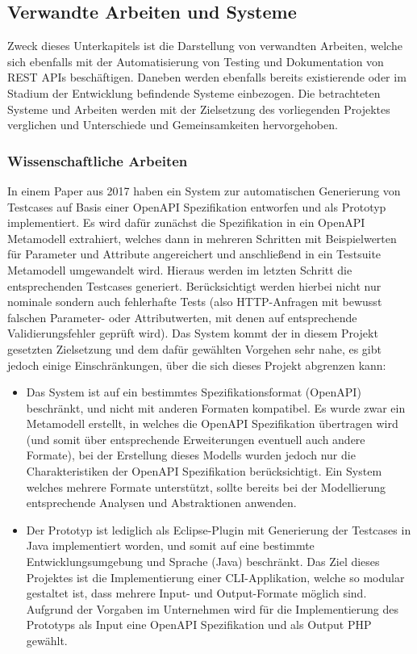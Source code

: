 \newpage

\subsection{Verwandte Arbeiten und Systeme}

Zweck dieses Unterkapitels ist die Darstellung von verwandten Arbeiten, welche sich ebenfalls mit der Automatisierung von Testing und Dokumentation von REST APIs beschäftigen. Daneben werden ebenfalls bereits existierende oder im Stadium der Entwicklung befindende Systeme einbezogen. Die betrachteten Systeme und Arbeiten werden mit der Zielsetzung des vorliegenden Projektes verglichen und Unterschiede und Gemeinsamkeiten hervorgehoben.

\subsubsection{Wissenschaftliche Arbeiten}

In einem Paper aus 2017 haben \textcite{ed2018automatic} ein System zur automatischen Generierung von Testcases auf Basis einer OpenAPI Spezifikation entworfen und als Prototyp implementiert. Es wird dafür zunächst die Spezifikation in ein OpenAPI Metamodell extrahiert, welches dann in mehreren Schritten mit Beispielwerten für Parameter und Attribute angereichert und anschließend in ein Testsuite Metamodell umgewandelt wird. Hieraus werden im letzten Schritt die entsprechenden Testcases generiert. Berücksichtigt werden hierbei nicht nur nominale sondern auch fehlerhafte Tests (also HTTP-Anfragen mit bewusst falschen Parameter- oder Attributwerten, mit denen auf entsprechende Validierungsfehler geprüft wird). Das System kommt der in diesem Projekt gesetzten Zielsetzung und dem dafür gewählten Vorgehen sehr nahe, es gibt jedoch einige Einschränkungen, über die sich dieses Projekt abgrenzen kann:
	\begin{itemize}
		\item Das System ist auf ein bestimmtes Spezifikationsformat (OpenAPI) beschränkt, und nicht mit anderen Formaten kompatibel. Es wurde zwar ein Metamodell erstellt, in welches die OpenAPI Spezifikation übertragen wird (und somit über entsprechende Erweiterungen eventuell auch andere Formate), bei der Erstellung dieses Modells wurden jedoch nur die Charakteristiken der OpenAPI Spezifikation berücksichtigt. Ein System welches mehrere Formate unterstützt, sollte bereits bei der Modellierung entsprechende Analysen und Abstraktionen anwenden.
		\item Der Prototyp ist lediglich als Eclipse-Plugin mit Generierung der Testcases in Java implementiert worden, und somit auf eine bestimmte Entwicklungsumgebung und Sprache (Java) beschränkt. Das Ziel dieses Projektes ist die Implementierung einer CLI-Applikation, welche so modular gestaltet ist, dass mehrere Input- und Output-Formate möglich sind. Aufgrund der Vorgaben im Unternehmen wird für die Implementierung des Prototyps als Input eine OpenAPI Spezifikation und als Output PHP gewählt.
	\end{itemize}
	
